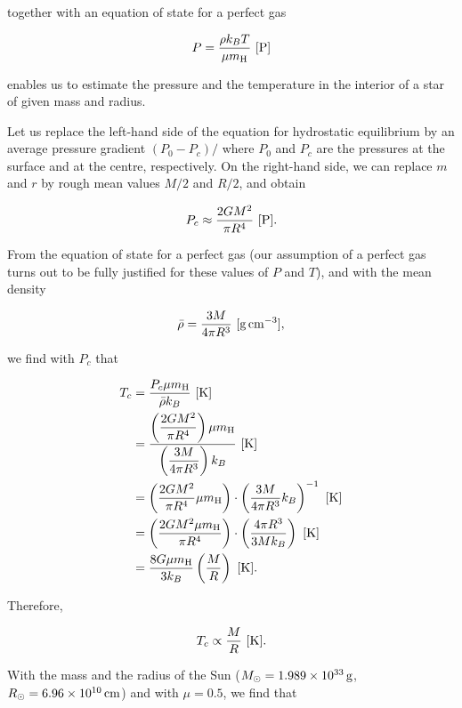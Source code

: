 \documentclass[a4paper,10pt]{article}
\begin{document}
{\noindent}together with an equation of state for a perfect gas

\begin{align*}
    P = \frac{\rho k_BT}{\mu m_{\rm H}} ~ [{\rm P}]
\end{align*}

{\noindent}enables us to estimate the pressure and the temperature in the interior of a star of given mass and radius.

{\noindent}Let us replace the left-hand side of the equation for hydrostatic equilibrium by an average pressure gradient $(P_0-P_c)/$ where $P_0$ and $P_c$ are the pressures at the surface and at the centre, respectively. On the right-hand side, we can replace $m$ and $r$ by rough mean values $M/2$ and $R/2$, and obtain

\begin{align*}
    P_c \approx \frac{2GM^2}{\pi R^4} ~ [{\rm P}].
\end{align*}

{\noindent}From the equation of state for a perfect gas (our assumption of a perfect gas turns out to be fully justified for these values of $P$ and $T$), and with the mean density

\begin{align*}
    \bar{\rho} = \frac{3M}{4\pi R^3} ~ [{\rm g\,cm^{-3}}],
\end{align*}

{\noindent}we find with $P_c$ that

\begin{align*}
    T_c &= \frac{P_c\mu m_{\rm H}}{\bar{\rho} k_B} ~ [{\rm K}] \\
    &= \frac{\left(\dfrac{2GM^2}{\pi R^4}\right)\mu m_{\rm H}}{\left(\dfrac{3M}{4\pi R^3}\right) k_B} ~ [{\rm K}] \\
    &= \left(\frac{2GM^2}{\pi R^4}\mu m_{\rm H}\right) \cdot \left(\frac{3M}{4\pi R^3}k_B\right)^{-1} ~ [{\rm K}] \\
    &= \left(\frac{2GM^2\mu m_{\rm H}}{\pi R^4}\right) \cdot \left(\frac{4\pi R^3}{3Mk_B}\right) ~ [{\rm K}] \\
    &= \frac{8G\mu m_{\rm H}}{3k_B}\left(\frac{M}{R}\right) ~ [{\rm K}].
\end{align*}

{\noindent}Therefore,

\begin{align*}
    T_c \propto \frac{M}{R} ~ [{\rm K}].
\end{align*}

{\noindent}With the mass and the radius of the Sun ($M_\odot=1.989\times10^{33}\,{\rm g}$, $R_\odot=6.96\times10^{10}\,{\rm cm}$) and with $\mu=0.5$, we find that
\end{document}
